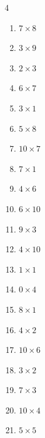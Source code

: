 \begin{multicols}{4}
\begin{enumerate}
  \item $7\times 8$
        \phantom{$=56$}

  \item $3\times 9$
        \phantom{$=27$}

  \item $2\times 3$
        \phantom{$=6$}

  \item $6\times 7$
        \phantom{$=42$}

  \item $3\times 1$
        \phantom{$=3$}

  \item $5\times 8$
        \phantom{$=40$}

  \item $10\times 7$
        \phantom{$=70$}

  \item $7\times 1$
        \phantom{$=7$}

  \item $4\times 6$
        \phantom{$=24$}

  \item $6\times 10$
        \phantom{$=60$}

  \item $9\times 3$
        \phantom{$=27$}

  \item $4\times 10$
        \phantom{$=40$}

  \item $1\times 1$
        \phantom{$=1$}

  \item $0\times 4$
        \phantom{$=0$}

\columnbreak %

  \item $8\times 1$
        \phantom{$=8$}

  \item $4\times 2$
        \phantom{$=8$}

  \item $10\times 6$
        \phantom{$=60$}

  \item $3\times 2$
        \phantom{$=6$}

  \item $7\times 3$
        \phantom{$=21$}

  \item $10\times 4$
        \phantom{$=40$}

  \item $5\times 5$
        \phantom{$=25$}


\end{enumerate}
\end{multicols}
